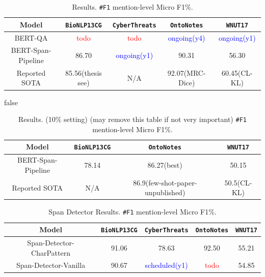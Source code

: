 \begin{table}[h!]
\centering
\begin{small}
\begin{tabular}{ccccc}\toprule
 \textbf{Model} & \texttt{BioNLP13CG} & \texttt{CyberThreats} & \texttt{OntoNotes} & \texttt{WNUT17} \\ \toprule 
BERT-QA & \textcolor{red}{todo} & \textcolor{red}{todo} & \textcolor{blue}{ongoing(y4)}  & \textcolor{blue}{ongoing(y1)} \\
BERT-Span-Pipeline     & 86.70 & \textcolor{blue}{ongoing(y1)} & 90.31 & 56.30  \\
Reported SOTA & 85.56(thesis see) & N/A & 92.07(MRC-Dice) & 60.45(CL-KL)  \\
\bottomrule
\end{tabular}
\caption{Results. \texttt{\#F1} mention-level Micro F1\%. }
\label{tab:main}
\end{small}
\end{table}

\if false
\begin{table}[h!]
\centering
\begin{small}
\begin{tabular}{cccc}\toprule
 \textbf{Model} & \texttt{BioNLP13CG} & \texttt{OntoNotes} & \texttt{WNUT17} \\ \toprule 
BERT-Span-Pipeline     & 78.14 & 86.27(best) & 50.15  \\
Reported SOTA & N/A & 86.9(few-shot-paper-unpublished) & 50.5(CL-KL)  \\
\bottomrule
\end{tabular}
\caption{Results. (10\% setting) (may remove this table if not very important) \texttt{\#F1} mention-level Micro F1\%.}
\label{tab:main}
\end{small}
\end{table}
\fi

\begin{table}[h!]
\centering
\begin{small}
\begin{tabular}{ccccc}\toprule
 \textbf{Model} & \texttt{BioNLP13CG} & \texttt{CyberThreats} & \texttt{OntoNotes} & \texttt{WNUT17} \\ \toprule 
Span-Detector-CharPattern & 91.06 & 78.63 & 92.50 & 55.21  \\
Span-Detector-Vanilla     & 90.67 & \textcolor{blue}{scheduled(y1)} & \textcolor{red}{todo} & 54.85  \\
\bottomrule
\end{tabular}
\caption{Span Detector Results. \texttt{\#F1} mention-level Micro F1\%.}
\label{tab:det_ablation}
\end{small}
\end{table}

